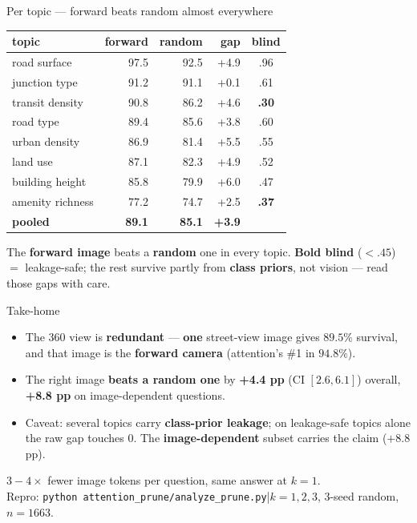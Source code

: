 \documentclass[aspectratio=169]{beamer}
\begin{document}
\begin{frame}{Per topic --- forward beats random almost everywhere}
\centering
\renewcommand{\arraystretch}{1.12}\small
\begin{tabular}{l r r r c}
\toprule
topic & \textcolor{fwdc}{\textbf{forward}} & random & gap & blind \\
\midrule
road surface     & 97.5 & 92.5 & \textcolor{good}{+4.9} & {\scriptsize.96}\\
junction type    & 91.2 & 91.1 & {+0.1} & {\scriptsize.61}\\
transit density  & 90.8 & 86.2 & \textcolor{good}{+4.6} & {\scriptsize\textbf{.30}}\\
road type        & 89.4 & 85.6 & \textcolor{good}{+3.8} & {\scriptsize.60}\\
urban density    & 86.9 & 81.4 & \textcolor{good}{+5.5} & {\scriptsize.55}\\
land use         & 87.1 & 82.3 & \textcolor{good}{+4.9} & {\scriptsize.52}\\
building height  & 85.8 & 79.9 & \textcolor{good}{+6.0} & {\scriptsize.47}\\
amenity richness & 77.2 & 74.7 & \textcolor{good}{+2.5} & {\scriptsize\textbf{.37}}\\
\midrule
\textbf{pooled}  & \textbf{89.1} & \textbf{85.1} & \textcolor{good}{\textbf{+3.9}} & \\
\bottomrule
\end{tabular}
\par\vspace{5pt}
\footnotesize The \textcolor{fwdc}{\textbf{forward image}} beats a \textbf{random} one in
every topic. \textbf{Bold blind} ($<.45$) $=$ leakage-safe; the rest survive partly
from \textbf{class priors}, not vision --- read those gaps with care.
\end{frame}

\begin{frame}{Take-home}
\large
\begin{itemize}
\item[\textcolor{good}{\ding{51}}] The 360\textdegree{} view is \textbf{redundant} ---
 \textbf{one} street-view image gives $89.5\%$ survival, and that image is the
 \textbf{forward camera} (attention's \#1 in $94.8\%$).
\item[\textcolor{good}{\ding{51}}] The right image \textbf{beats a random one} by
 \textbf{+4.4 pp} (CI $[2.6,6.1]$) overall, \textbf{+8.8 pp} on image-dependent
 questions.
\item[\textcolor{bad}{\ding{55}}] Caveat: several topics carry \textbf{class-prior
 leakage}; on leakage-safe topics alone the raw gap touches 0. The
 \textbf{image-dependent} subset carries the claim ($+8.8$ pp).
\end{itemize}
\vspace{8pt}
\normalsize\centering\footnotesize
$3{-}4{\times}$ fewer image tokens per question, same answer at $k{=}1$.\\[2pt]
Repro: \texttt{python attention\_prune/analyze\_prune.py}\;|\;$k{=}1,2,3$, 3-seed random, $n{=}1663$.
\end{frame}
\end{document}
